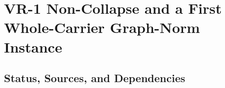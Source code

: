 \section{VR-1 Non-Collapse and a First Whole-Carrier Graph-Norm Instance}\label{sec:vr1-noncollapse-first-instance}

\subsection{Status, Sources, and Dependencies}

